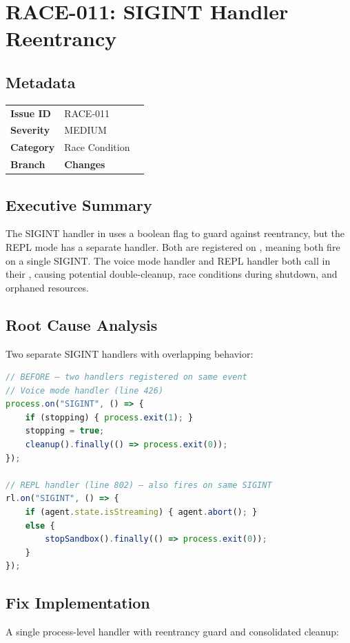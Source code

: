 \section{RACE-011: SIGINT Handler Reentrancy}
\label{sec:race-011}
\subsection*{Metadata}
\begin{tabular}{ll}
\textbf{Issue ID} & RACE-011 \\
\textbf{Severity} & MEDIUM \\
\textbf{Category} & Race Condition \\
\textbf{Branch} & 
\textbf{Changes} &  \\
\end{tabular}

\subsection*{Executive Summary}
The SIGINT handler in  uses a  boolean flag to guard against reentrancy, but the REPL mode has a separate  handler. Both are registered on , meaning both fire on a single SIGINT. The voice mode handler and REPL handler both call  in their , causing potential double-cleanup, race conditions during shutdown, and orphaned resources.

\subsection*{Root Cause Analysis}
Two separate SIGINT handlers with overlapping behavior:

\begin{lstlisting}[language=TypeScript]
// BEFORE — two handlers registered on same event
// Voice mode handler (line 426)
process.on("SIGINT", () => {
    if (stopping) { process.exit(1); }
    stopping = true;
    cleanup().finally(() => process.exit(0));
});

// REPL handler (line 802) — also fires on same SIGINT
rl.on("SIGINT", () => {
    if (agent.state.isStreaming) { agent.abort(); }
    else {
        stopSandbox().finally(() => process.exit(0));
    }
});
\end{lstlisting}

\subsection*{Fix Implementation}
A single process-level handler with reentrancy guard and consolidated cleanup:

